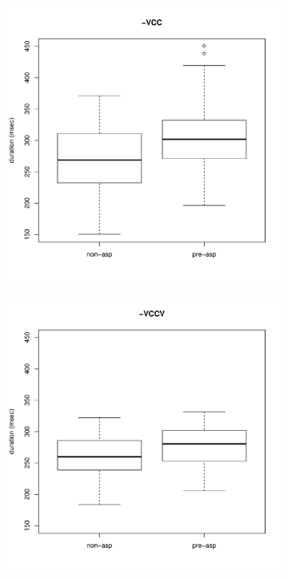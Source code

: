 \documentclass[11pt,a4paper,openany]{memoir}\usepackage[]{graphicx}\usepackage[]{color}
\newenvironment{knitrout}{}{} %
\begin{document}
\begin{figure}
\begin{subfigure}{.5\textwidth}
\centering
\begin{knitrout}
\color{fgcolor}
\includegraphics[width=\textwidth]{img/mono-stop-vor-1} 

\end{knitrout}
\end{subfigure}
\begin{subfigure}{.5\textwidth}
\centering
\begin{knitrout}
\color{fgcolor}
\includegraphics[width=\textwidth]{img/di-stop-vor-1} 


\end{knitrout}
\end{subfigure}
\end{figure}
\end{document}
